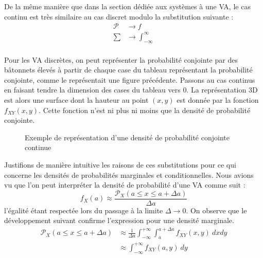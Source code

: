 \documentclass[a4paper,12pt]{report}
\theoremstyle{definition}
\newcommand{\ra}{\rightarrow}
\renewcommand{\(}{\left(}
\renewcommand{\)}{\right)}
\renewcommand{\P}{\mathcal{P}}
\begin{document}
        De la même manière que dans la section dédiée aux systèmes à une VA, le cas continu est très similaire au cas discret modulo la substitution suivante :
        \begin{align*}
            \P &\ra f \\
            \sum &\ra \int_{-\infty}^{\infty} \\
        \end{align*}
    
        Pour les VA discrètes, on peut représenter la probabilité conjointe par des bâtonnets élevés à partir de chaque case du tableau représentant la probabilité conjointe, comme le représentait une figure précédente. Passons au cas continus en faisant tendre la dimension des cases du tableau vers $0$. La représentation 3D est alors une surface dont la hauteur au point $(x,y)$ est donnée par la fonction $f_{XY}(x,y)$. Cette fonction n'est ni plus ni moins que la densité de probabilité conjointe.
        
        \begin{figure}[H]
            \centering
            \caption{Exemple de représentation d'une densité de probabilité conjointe continue}
            \label{3drepr2}
        \end{figure}
        
        Justifions de manière intuitive les raisons de ces substitutions pour ce qui concerne les densités de probabilités marginales et conditionnelles. Nous avions vu que l'on peut interpréter la densité de probabilité d'une VA comme suit :
        $$f_X(a)\approx\frac{\P_X(a\leq x\leq a+\Delta a)}{\Delta a}$$
        l'égalité étant respectée lors du passage à la limite $\Delta  \ra 0$. On observe que le développement suivant confirme l'expression pour une densité marginale.
        \begin{align*}
            \P_X(a\leq x\leq a+\Delta a)&\approx\frac{1}{\Delta a}\int_{-\infty}^{+\infty}\int_{a}^{a+\Delta a}f_{XY}(x,y)~dxdy\\
            &\approx \int_{-\infty}^{+\infty}f_{XY}(a,y)~dy
        \end{align*}
        
\end{document}
